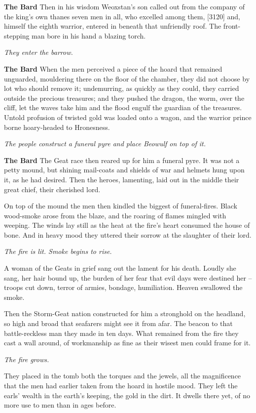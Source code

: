 \documentclass[a4paper]{article}
\begin{document}
{\textbf{The Bard} Then in his wisdom Weoxstan’s son
called out from the company of the king’s own thanes
seven men in all, who excelled among them,
[3120] and, himself the eighth warrior, entered in beneath
that unfriendly roof. The front-stepping man
bore in his hand a blazing torch.

\centerline{\textit{They enter the barrow.}}

\textbf{The Bard} When the men perceived a piece of the hoard
that remained unguarded, mouldering there
on the floor of the chamber, they did not choose by lot
who should remove it; undemurring,
as quickly as they could, they carried outside
the precious treasures; and they pushed the dragon,
the worm, over the cliff, let the waves take him
and the flood engulf the guardian of the treasures.
Untold profusion of twisted gold
was loaded onto a wagon, and the warrior prince
borne hoary-headed to Hronesness.

\centerline{\textit{The people construct a funeral pyre and place Beowulf on top of it.}}

\textbf{The Bard} The Geat race then reared up for him
a funeral pyre. It was not a petty mound,
but shining mail-coats and shields of war
and helmets hung upon it, as he had desired.
Then the heroes, lamenting, laid out in the middle
their great chief, their cherished lord.

On top of the mound the men then kindled
the biggest of funeral-fires. Black wood-smoke
arose from the blaze, and the roaring of flames
mingled with weeping. The winds lay still
as the heat at the fire’s heart consumed
the house of bone. And in heavy mood
they uttered their sorrow at the slaughter of their lord.

\centerline{\textit{The fire is lit. Smoke begins to rise.}}

A woman of the Geats in grief sang out
the lament for his death. Loudly she sang,
her hair bound up, the burden of her fear
that evil days were destined her
– troops cut down, terror of armies,
bondage, humiliation. Heaven swallowed the smoke.

Then the Storm-Geat nation constructed for him
a stronghold on the headland, so high and broad
that seafarers might see it from afar.
The beacon to that battle-reckless man
they made in ten days. What remained from the fire
they cast a wall around, of workmanship
as fine as their wisest men could frame for it.

\centerline{\textit{The fire grows.}}

They placed in the tomb both the torques and the jewels,
all the magnificence that the men had earlier
taken from the hoard in hostile mood.
They left the earls’ wealth in the earth’s keeping,
the gold in the dirt. It dwells there yet,
of no more use to men than in ages before.

}
\end{document}
